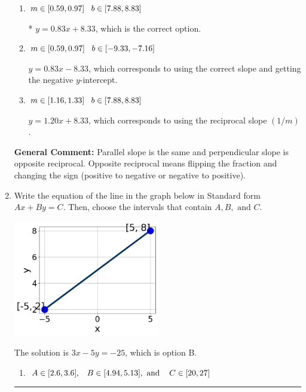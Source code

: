 \documentclass{extbook}[14pt]
\newcommand{\litem}[1]{\item #1

\rule{\textwidth}{0.4pt}}
\begin{document}
\begin{enumerate}
{\begin{enumerate}[label=\Alph*.]
 $y = 0.83x + 9.00$, which corresponds to correct slope and mis-distributing while simplifying to slope-intercept form.
\item \( m \in [0.59, 0.97] \hspace*{3mm} b \in [7.88, 8.83] \)

* $y = 0.83x + 8.33$, which is the correct option.
\item \( m \in [0.59, 0.97] \hspace*{3mm} b \in [-9.33, -7.16] \)

 $y = 0.83x - 8.33$, which corresponds to using the correct slope and getting the negative $y$-intercept.
\item \( m \in [1.16, 1.33] \hspace*{3mm} b \in [7.88, 8.83] \)

 $y = 1.20x + 8.33$, which corresponds to using the reciprocal slope $(1/m)$.
\end{enumerate}

\textbf{General Comment:} Parallel slope is the same and perpendicular slope is opposite reciprocal. Opposite reciprocal means flipping the fraction and changing the sign (positive to negative or negative to positive).
}
\litem{
Write the equation of the line in the graph below in Standard form $Ax+By=C$. Then, choose the intervals that contain $A, B, \text{ and } C$.

\begin{center}
    \includegraphics[width=0.5\textwidth]{../Figures/linearGraphToStandardCopyB.png}
\end{center}



The solution is \( 3x - 5y = -25 \), which is option B.\begin{enumerate}[label=\Alph*.]
\item \( A \in [2.6, 3.6], \hspace{3mm} B \in [4.94, 5.13], \text{ and } \hspace{3mm} C \in [20, 27] \)


\end{enumerate}}
\end{enumerate}
\end{document}
